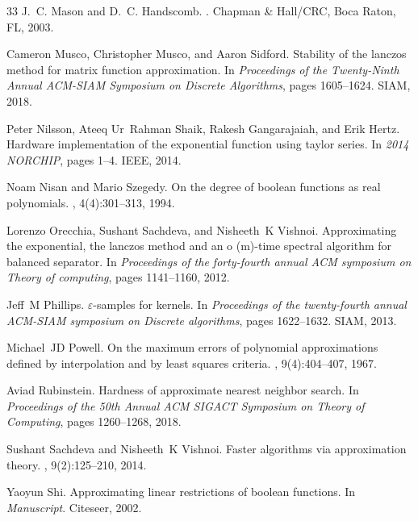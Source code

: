 \documentclass[10pt,a4paper]{article}
\theoremstyle{plain}\newtheorem{theorem}{Theorem}
\theoremstyle{definition}
\begin{document}
\begin{thebibliography}{33}
J.~C. Mason and D.~C. Handscomb.
.
\newblock Chapman \& Hall/CRC, Boca Raton, FL, 2003.

Cameron Musco, Christopher Musco, and Aaron Sidford.
\newblock Stability of the lanczos method for matrix function approximation.
\newblock In {\em Proceedings of the Twenty-Ninth Annual ACM-SIAM Symposium on
  Discrete Algorithms}, pages 1605--1624. SIAM, 2018.

Peter Nilsson, Ateeq Ur~Rahman Shaik, Rakesh Gangarajaiah, and Erik Hertz.
\newblock Hardware implementation of the exponential function using taylor
  series.
\newblock In {\em 2014 NORCHIP}, pages 1--4. IEEE, 2014.

Noam Nisan and Mario Szegedy.
\newblock On the degree of boolean functions as real polynomials.
, 4(4):301--313, 1994.

Lorenzo Orecchia, Sushant Sachdeva, and Nisheeth~K Vishnoi.
\newblock Approximating the exponential, the lanczos method and an o (m)-time
  spectral algorithm for balanced separator.
\newblock In {\em Proceedings of the forty-fourth annual ACM symposium on
  Theory of computing}, pages 1141--1160, 2012.

Jeff~M Phillips.
\newblock $\varepsilon$-samples for kernels.
\newblock In {\em Proceedings of the twenty-fourth annual ACM-SIAM symposium on
  Discrete algorithms}, pages 1622--1632. SIAM, 2013.

Michael~JD Powell.
\newblock On the maximum errors of polynomial approximations defined by
  interpolation and by least squares criteria.
, 9(4):404--407, 1967.

Aviad Rubinstein.
\newblock Hardness of approximate nearest neighbor search.
\newblock In {\em Proceedings of the 50th Annual ACM SIGACT Symposium on Theory
  of Computing}, pages 1260--1268, 2018.

Sushant Sachdeva and Nisheeth~K Vishnoi.
\newblock Faster algorithms via approximation theory.
, 9(2):125--210, 2014.

Yaoyun Shi.
\newblock Approximating linear restrictions of boolean functions.
\newblock In {\em Manuscript}. Citeseer, 2002.


\end{thebibliography}
\end{document}
